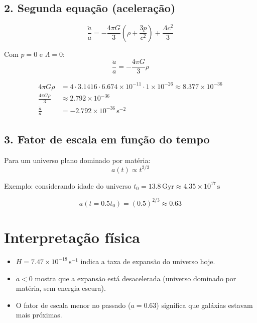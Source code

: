 \documentclass[12pt]{article}
\begin{document}
\subsection*{2. Segunda equação (aceleração)}
\[
\frac{\ddot a}{a} = -\frac{4 \pi G}{3} \left(\rho + \frac{3p}{c^2}\right) + \frac{\Lambda c^2}{3}
\]

Com \(p = 0\) e \(\Lambda = 0\):
\[
\frac{\ddot a}{a} = -\frac{4 \pi G}{3} \rho
\]

\begin{align*}
4 \pi G \rho &= 4 \cdot 3.1416 \cdot 6.674 \times 10^{-11} \cdot 1 \times 10^{-26} \approx 8.377 \times 10^{-36} \\
\frac{4 \pi G \rho}{3} &\approx 2.792 \times 10^{-36} \\
\frac{\ddot a}{a} &= -2.792 \times 10^{-36}\, \mathrm{s^{-2}}
\end{align*}

\subsection*{3. Fator de escala em função do tempo}

Para um universo plano dominado por matéria:
\[
a(t) \propto t^{2/3}
\]

Exemplo: considerando idade do universo \(t_0 = 13.8\,\mathrm{Gyr} \approx 4.35 \times 10^{17}\,\mathrm{s}\)

\[
a(t = 0.5 t_0) = (0.5)^{2/3} \approx 0.63
\]

\section*{Interpretação física}

\begin{itemize}
    \item \(H = 7.47 \times 10^{-18}\, \mathrm{s^{-1}}\) indica a taxa de expansão do universo hoje.
    \item \(\ddot a < 0\) mostra que a expansão está desacelerada (universo dominado por matéria, sem energia escura).
    \item O fator de escala menor no passado (\(a = 0.63\)) significa que galáxias estavam mais próximas.
\end{itemize}
\end{document}
